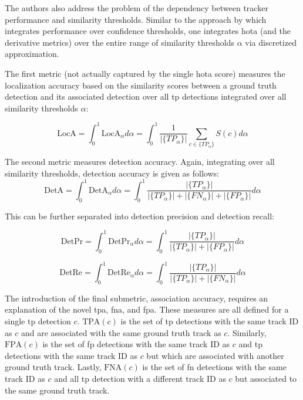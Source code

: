 \documentclass[headsepline, hidelinks, footsepline, footinclude=false, oneside, fontsize=11pt, paper=a4, listof=totoc, bibliography=totoc]{scrbook}
\begin{document}
The authors also address the problem of the dependency between tracker performance and similarity thresholds. 
Similar to the approach by \cite{wengBaseline3DMultiObject2019} which integrates performance over confidence thresholds, 
one integrates \gls{hota} (and the derivative metrics) over the entire range of similarity thresholds \(\alpha\) via discretized approximation.

The first metric (not actually captured by the single \gls{hota} score) measures the localization accuracy based on the similarity scores between a 
ground truth detection and its associated detection over all \gls{tp} detections integrated over all similarity thresholds \(\alpha\):

\begin{equation}
\label{eq:hota-loca}
    \text{LocA} =\int_0^1\text{LocA}_\alpha d\alpha = \int_0^1\frac{1}{|\{TP_\alpha\}|} \sum_{c \in \{TP_\alpha\}} S(c)d\alpha
\end{equation}

The second metric measures detection accuracy. Again, integrating over all similarity thresholds, detection accuracy is given as follows:
\begin{equation}
\label{eq:hota-deta}
\text{DetA} = \int_0^1 \text{DetA}_\alpha d\alpha = \int_0^1 \frac{|\{TP_\alpha\}|}{|\{TP_\alpha\}| + |\{FN_\alpha\}| + |\{FP_\alpha\}|} d\alpha
\end{equation}

This can be further separated into detection precision and detection recall:

\begin{equation}
\label{eq:hota-det-pr}
\text{DetPr} = \int_0^1\text{DetPr}_\alpha d\alpha= \int_0^1 \frac{|\{TP_\alpha\}|}{|\{TP_\alpha\}| + |\{FP_\alpha\}|} d\alpha
\end{equation}

\begin{equation}
\label{eq:hota-det-re}
\text{DetRe} = \int_0^1 \text{DetRe}_\alpha d\alpha= \int_0^1 \frac{|\{TP_\alpha\}|}{|\{TP_\alpha\}| + |\{FN_\alpha\}|} d\alpha
\end{equation}

The introduction of the final submetric, association accuracy, requires an explanation of the novel \gls{tpa}, \gls{fna}, and \gls{fpa}.
These measures are all defined for a single \gls{tp} detection \(c\). \(\text{TPA}(c)\) is the set of \gls{tp} detections with the same track ID as \(c\) and are associated with the same ground truth track as \(c\). 
Similarly, \(\text{FPA}(c)\) is the set of \gls{fp} detections with the same track ID as \(c\) and \gls{tp} detections with the same track ID as \(c\) but which are associated with another ground truth track.
Lastly, \(\text{FNA}(c)\) is the set of \gls{fn} detections with the same track ID as \(c\) and all \gls{tp} detection with a different track ID as \(c\) but associated to the same ground truth track.
\end{document}
